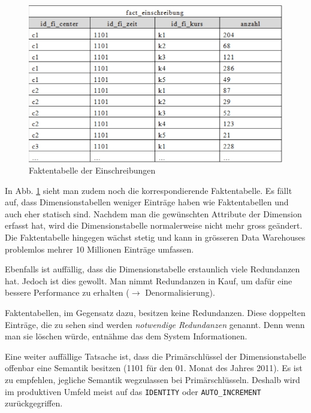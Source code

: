 \documentclass[a4paper, 11pt, nofootinbib]{article}
\begin{document}
\begin{figure}
	\centering
	\includegraphics[keepaspectratio=true,height=10\baselineskip]{fact_table.jpg}
	\caption{Faktentabelle der Einschreibungen}
	\label{fig:fact_table}
\end{figure}

\noindent In Abb. \ref{fig:fact_table} sieht man zudem noch die korrespondierende Faktentabelle. Es fällt auf, dass Dimensionstabellen weniger Einträge haben wie Faktentabellen und auch eher statisch sind. Nachdem man die gewünschten Attribute der Dimension erfasst hat, wird die Dimensionstabelle normalerweise nicht mehr gross geändert. Die Faktentabelle hingegen wächst stetig und kann in grösseren Data Warehouses problemlos mehrer 10 Millionen Einträge umfassen.

\vspace{10px}

\noindent Ebenfalls ist auffällig, dass die Dimensionstabelle erstaunlich viele Redundanzen hat. Jedoch ist dies gewollt. Man nimmt Redundanzen in Kauf, um dafür eine bessere Performance zu erhalten ($\rightarrow$ Denormalisierung).

Faktentabellen, im Gegensatz dazu, besitzen keine Redundanzen. Diese doppelten Einträge, die zu sehen sind werden \textit{notwendige Redundanzen} genannt. Denn wenn man sie löschen würde, entnähme das dem System Informationen.

\vspace{10px}

\noindent Eine weiter auffällige Tatsache ist, dass die Primärschlüssel der Dimensionstabelle offenbar eine Semantik besitzen (1101 für den 01. Monat des Jahres 2011). Es ist zu empfehlen, jegliche Semantik wegzulassen bei Primärschlüsseln. Deshalb wird im produktiven Umfeld meist auf das \verb|IDENTITY| oder \verb|AUTO_INCREMENT| zurückgegriffen.
\end{document}
